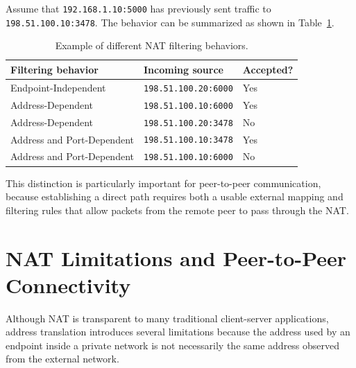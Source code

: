 \begin{example}
	Assume that \texttt{192.168.1.10:5000} has previously sent traffic to \\
	\texttt{198.51.100.10:3478}. The behavior can be summarized as shown in Table~\ref{tab:filtering-behavior}.

	\begin{table}[htbp]
		\centering
		\caption{Example of different NAT filtering behaviors.}
		\label{tab:filtering-behavior}

		\begin{tabular}{lll}
			\toprule
			Filtering behavior & Incoming source             & Accepted? \\
			\midrule

			Endpoint-Independent
			                   & \texttt{198.51.100.20:6000}
			                   & Yes                                     \\

			Address-Dependent
			                   & \texttt{198.51.100.10:6000}
			                   & Yes                                     \\

			Address-Dependent
			                   & \texttt{198.51.100.20:3478}
			                   & No                                      \\

			Address and Port-Dependent
			                   & \texttt{198.51.100.10:3478}
			                   & Yes                                     \\

			Address and Port-Dependent
			                   & \texttt{198.51.100.10:6000}
			                   & No                                      \\

			\bottomrule
		\end{tabular}
	\end{table}

\end{example}
This distinction is particularly important for peer-to-peer communication, because establishing a direct path requires both a usable external mapping and filtering rules that allow packets from the remote peer to pass through the NAT.

\section{NAT Limitations and Peer-to-Peer Connectivity}
Although NAT is transparent to many traditional client-server applications, address translation introduces several limitations because the address used by an endpoint inside a private network is not necessarily the same address observed from the external network.

